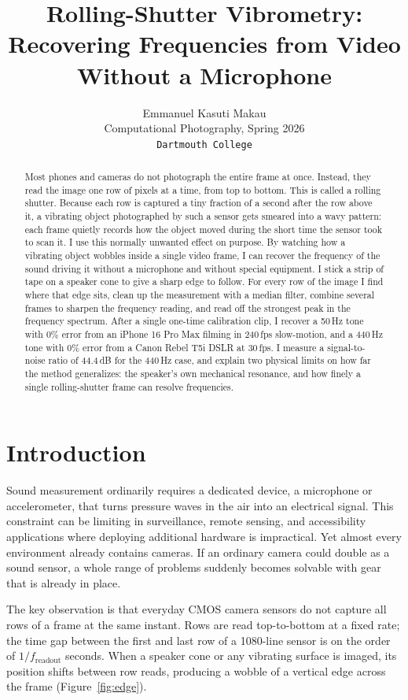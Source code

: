 \documentclass[10pt,twocolumn,letterpaper]{article}
\title{\vspace{-1em}%
  \textbf{Rolling-Shutter Vibrometry:}\\
  Recovering Frequencies from Video Without a Microphone%
  \vspace{-0.5em}
}
\author{%
  Emmanuel Kasuti Makau\\
  Computational Photography, Spring 2026\\
  \texttt{Dartmouth College}
}
\date{}
\begin{document}
\maketitle
\thispagestyle{empty}

\begin{abstract}
Most phones and cameras do not photograph the entire frame at once. Instead, they read the image one row of pixels at a time, from top to bottom. This is called a rolling shutter. Because each row is captured a tiny fraction of a second after the row above it, a vibrating object photographed by such a sensor gets smeared into a wavy pattern: each frame quietly records how the object moved during the short time the sensor took to scan it. I use this normally unwanted effect on purpose. By watching how a vibrating object wobbles inside a single video frame, I can recover the frequency of the sound driving it without a microphone and without special equipment. I stick a strip of tape on a speaker cone to give a sharp edge to follow. For every row of the image I find where that edge sits, clean up the measurement with a median filter, combine several frames to sharpen the frequency reading, and read off the strongest peak in the frequency spectrum. After a single one-time calibration clip, I recover a 50\,Hz tone with 0\% error from an iPhone 16 Pro Max filming in 240\,fps slow-motion, and a 440\,Hz tone with 0\% error from a Canon Rebel T5i DSLR at 30\,fps. I measure a signal-to-noise ratio of 44.4\,dB for the 440\,Hz case, and explain two physical limits on how far the method generalizes: the speaker's own mechanical resonance, and how finely a single rolling-shutter frame can resolve frequencies.
\end{abstract}

\section{Introduction}

Sound measurement ordinarily requires a dedicated device, a microphone or accelerometer, that turns pressure waves in the air into an electrical signal. This constraint can be limiting in surveillance, remote sensing, and accessibility applications where deploying additional hardware is impractical. Yet almost every environment already contains cameras. If an ordinary camera could double as a sound sensor, a whole range of problems suddenly becomes solvable with gear that is already in place.

The key observation is that everyday CMOS camera sensors do not capture all rows of a frame at the same instant. Rows are read top-to-bottom at a fixed rate; the time gap between the first and last row of a 1080-line sensor is on the order of $1/f_\text{readout}$ seconds. When a speaker cone or any vibrating surface is imaged, its position shifts between row reads, producing a wobble of a vertical edge across the frame (Figure~\ref{fig:edge}).
\end{document}
